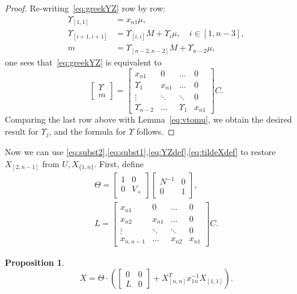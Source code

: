 \documentclass{amsart}
\newtheorem{proposition}[theorem]{Proposition}
\theoremstyle{definition}
\theoremstyle{remark}
\numberwithin{equation}{section}
\numberwithin{theorem}{section}
\def\smup{{\scriptstyle\Upsilon}}
\begin{document}
\begin{proof} Re-writing~\eqref{eq:greekYZ} row by row:
\begin{align*}
\Upsilon_{[1,1]} &= x_{n1} \mu,\\
\Upsilon_{[i+1,i+1]} &= \Upsilon_{[i,i]} M + \smup_i \mu, \quad i\in[1, n-3],\\
m &= \Upsilon_{[n-2,n-2]} M + \smup_{n-2} \mu,
\end{align*}
one sees that~\eqref{eq:greekYZ} is equivalent to
\begin{equation}
\label{eq:greekYp}
\begin{bmatrix} \Upsilon \\ m \end{bmatrix}   =   
\begin{bmatrix} x_{n1}&0 & \dots& 0 \\ \smup_1 & x_{n1}  &\dots &0\\ \vdots & \ddots & \ddots & 0\\
 \smup_{n-2} &  \dots & \smup_1 & x_{n1}\end{bmatrix} C.
\end{equation}
Comparing the last row above  with Lemma~\ref{eq:vtomu}, we obtain the desired result for $\smup_j$, and the formula for $\Upsilon$ follows.
\end{proof}

Now we can use \eqref{eq:subst2},\eqref{eq:subst1},\eqref{eq:YZdef},\eqref{eq:tildeXdef} to restore $X_{[2,n-1]}$ from $U, X_{\{1,n\}}$. First, define
\begin{gather*}
\Theta = \begin{bmatrix}   1 & 0\\ 0 & V_+  \end{bmatrix} \begin{bmatrix}   N^{-1} & 0\\ 0 & 1  \end{bmatrix},\\
L= \begin{bmatrix} x_{n1}& 0&\dots & 0 \\ x_{n2} & x_{n1}  &\dots &0\\ \vdots & \ddots & \ddots &0 \\  
x_{n,n-1}  &  \dots &  x_{n2}  & x_{n1}\end{bmatrix}C.
\end{gather*}

\begin{proposition} 
\label{prop:theta}
\begin{equation}
\label{eq:ThetaL}
X = \Theta \cdot \left ( \begin{bmatrix}0 & 0\\ L &0\end{bmatrix} + X_{[n,n]}^T x_{1n}^{-1} X_{[1,1]} \right ).
\end{equation}
\end{proposition}
\end{document}
